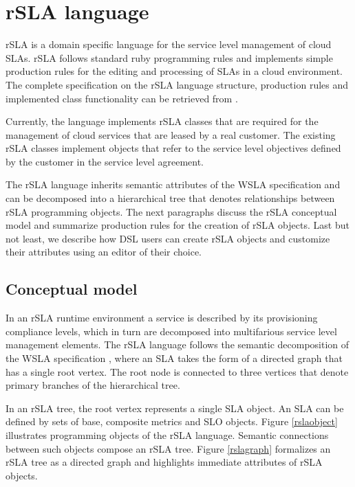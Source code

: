 \section{rSLA language}

rSLA is a domain specific language for the service level management of cloud SLAs. rSLA follows standard ruby programming rules and implements simple production rules for the editing and processing of SLAs in a cloud environment. The complete specification on the rSLA language structure, production rules and implemented class functionality can be retrieved from \cite{rSLAspec}.

Currently, the language implements rSLA classes that are required for the management of cloud services that are leased by a real customer. The existing rSLA classes implement objects that refer to the service level objectives defined by the customer in the service level agreement.   

The rSLA language inherits semantic attributes of the WSLA specification \cite{wsla} and can be decomposed into a hierarchical tree that denotes relationships between rSLA programming objects. 
 The next paragraphs discuss the rSLA conceptual model and summarize production rules for the creation of rSLA objects. Last but not least, we describe how DSL users can create rSLA objects and customize their attributes using an editor of their choice. 


\subsection{Conceptual model}
In an rSLA runtime environment a service is described by its provisioning compliance levels, which in turn are decomposed into multifarious service level management elements. The rSLA language follows the semantic decomposition of the WSLA specification \cite{wsla}, where an SLA takes the form of a directed graph that has a single root vertex. The root node is connected to three vertices that denote primary branches of the hierarchical tree. 

In an rSLA tree, the root vertex represents a single SLA object. An SLA can be defined by sets of base, composite metrics and SLO objects. Figure \ref{rslaobject} illustrates programming objects of the rSLA language. Semantic connections between such objects compose an rSLA tree. Figure \ref{rslagraph} formalizes an rSLA tree as a directed graph and highlights immediate attributes of rSLA objects.

